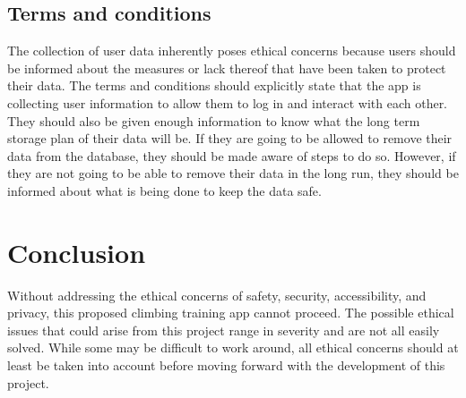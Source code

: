 \documentclass[10pt,twocolumn]{article}
\begin{document}
\subsection{Terms and conditions}

The collection of user data inherently poses ethical concerns because users should be informed about the measures or lack thereof that have been taken to protect their data. The terms and conditions should explicitly state that the app is collecting user information to allow them to log in and interact with each other. They should also be given enough information to know what the long term storage plan of their data will be. If they are going to be allowed to remove their data from the database, they should be made aware of steps to do so. However, if they are not going to be able to remove their data in the long run, they should be informed about what is being done to keep the data safe. \cite{gebru_datasheets_2021}

\section{Conclusion}

Without addressing the ethical concerns of safety, security, accessibility, and privacy, this proposed climbing training app cannot proceed. The possible ethical issues that could arise from this project range in severity and are not all easily solved. While some may be difficult to work around, all ethical concerns should at least be taken into account before moving forward with the development of this project. 




\printbibliography
\end{document}
